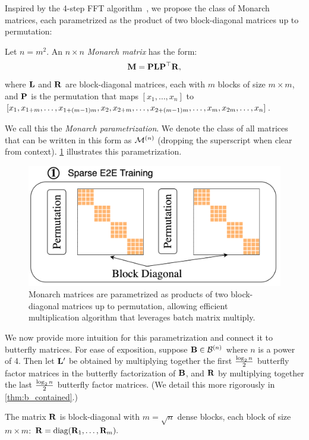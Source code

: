 Inspired by the 4-step FFT algorithm~\citep{bailey1990ffts}, we propose
the class of Monarch matrices, each 
parametrized as the product of two block-diagonal matrices up to permutation:
\begin{definition}\label{def:Monarch}
  Let $n = m^2$. An $n \times n$ \emph{Monarch matrix} has the form:
  \begin{equation*}
    \mathbf{M} = \mathbf{P} \mathbf{L} \mathbf{P}^\top \mathbf{R},
  \end{equation*}
  where $\mathbf{L}$ and $\mathbf{R}$ are block-diagonal matrices, each with $m$ blocks of
  size $m \times m$, and $\mathbf{P}$ is the permutation that maps
  $[x_1, \dots, x_n]$ to
  $[x_1, x_{1+m}, \dots, x_{1+(m-1)m}, x_2, x_{2+m}, \dots, \newline x_{2+(m-1)m}, \dots, x_{m}, x_{2m}, \dots, x_n]$.
\end{definition}
We call this the \emph{Monarch parametrization}. We denote the class of all
matrices that can be written in this form as $\mathcal{M}^{(n)}$ (dropping the superscript when clear from context).
\cref{fig:blockdiag_parametrization} illustrates this parametrization.
\begin{figure}[t]
  \centering
  \includegraphics[width=.45\textwidth]{figures/Monarch-1.png}
  \vspace{-1em}
  \caption{\label{fig:blockdiag_parametrization}Monarch matrices are parametrized as products of two block-diagonal
    matrices up to permutation, allowing efficient multiplication algorithm that leverages batch
    matrix multiply.}
  \vspace{-0.5em}
\end{figure}

We now provide more intuition for this parametrization and connect it to butterfly
matrices.
For ease of exposition, suppose $\mathbf{B} \in \mathcal{B}^{(n)}$ where $n$ is a power of 4.
Then let $\mathbf{L}'$ be obtained by multiplying together the first $\tfrac{\log_2 n}{2}$
butterfly factor matrices in the butterfly factorization of $\mathbf{B}$,
and $\mathbf{R}$ by multiplying together the last $\tfrac{\log_2 n}{2}$ butterfly factor matrices.
(We detail this more rigorously in \cref{thm:b_contained}.)

The matrix $\mathbf{R}$ is block-diagonal with $m = \sqrt{n}$ dense blocks, each block of size
$m \times m$:
$
  \mathbf{R} = \mathrm{diag}(\mathbf{R}_1, \dots, \mathbf{R}_{m}).
$


